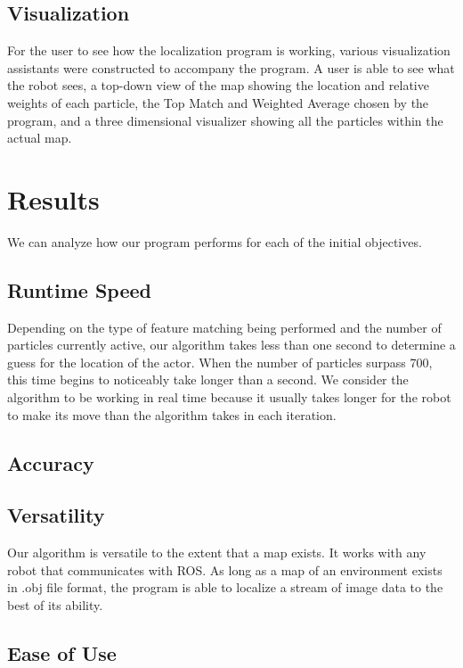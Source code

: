 \documentclass[a4paper,11pt]{article}
\begin{document}
\subsection{Visualization}
For the user to see how the localization program is working, various visualization assistants were constructed to accompany the program. A user is able to see what the robot sees, a top-down view of the map showing the location and relative weights of each particle, the Top Match and Weighted Average chosen by the program, and a three dimensional visualizer showing all the particles within the actual map.












\section{Results}
We can analyze how our program performs for each of the initial objectives.

\subsection{Runtime Speed}
Depending on the type of feature matching being performed and the number of particles currently active, our algorithm takes less than one second to determine a guess for the location of the actor. When the number of particles surpass 700, this time begins to noticeably take longer than a second. We consider the algorithm to be working in real time because it usually takes longer for the robot to make its move than the algorithm takes in each iteration.

\subsection{Accuracy}


\subsection{Versatility}
Our algorithm is versatile to the extent that a map exists. It works with any robot that communicates with ROS. As long as a map of an environment exists in .obj file format, the program is able to localize a stream of image data to the best of its ability.

\subsection{Ease of Use}%
\end{document}
